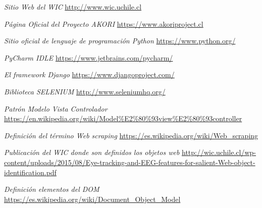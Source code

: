 \newpage %
\begin{references}
	\textit{Sitio Web del WIC}
	\url{http://www.wic.uchile.cl}
	
	\textit{Página Oficial del Proyecto AKORI} 
	\url{https://www.akoriproject.cl}
	
	\textit{Sitio oficial de lenguaje de programación \textit{Python}}
	\url{https://www.python.org/}
	
	\textit{PyCharm IDLE}
	\url{https://www.jetbrains.com/pycharm/}
	
	\textit{El framework \textit{Django}}
	\url{https://www.djangoproject.com/}
	
	\textit{Biblioteca SELENIUM}
	\url{http://www.seleniumhq.org/}
	
	\textit{Patrón Modelo Vista Controlador}
	\url{https://en.wikipedia.org/wiki/Model%E2%80%93view%E2%80%93controller}
	
	\textit{Definición del término Web scraping}
	\url{https://es.wikipedia.org/wiki/Web_scraping}
	
	\textit{Publicación del WIC donde son definidos los objetos web}
	\url{http://wic.uchile.cl/wp-content/uploads/2015/08/Eye-tracking-and-EEG-features-for-salient-Web-object-identification.pdf}
	
	\textit{Definición elementos del DOM}
	\url{https://es.wikipedia.org/wiki/Document_Object_Model}
	
	
	

\end{references}
